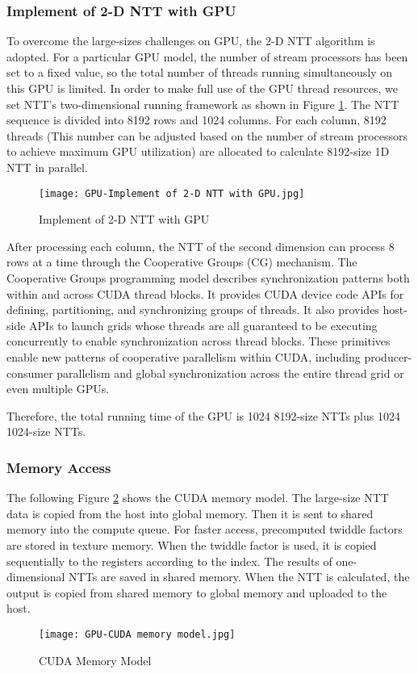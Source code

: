 \subsubsection{Implement of 2-D NTT with GPU}
To overcome the large-sizes challenges on GPU, the 2-D NTT algorithm is adopted. For a particular GPU model, the number of stream processors has been set to a fixed value, so the total number of threads running simultaneously on this GPU is limited. In order to make full use of the GPU thread resources, we set NTT's two-dimensional running framework as shown in Figure \ref{fig:Implement of 2-D NTT with GPU}. The NTT sequence is divided into 8192 rows and 1024 columns. For each column, 8192 threads (This number can be adjusted based on the number of stream processors to achieve maximum GPU utilization) are allocated to calculate 8192-size 1D NTT in parallel.
\begin{figure}[!ht]
    \centering
    \texttt{[image: GPU-Implement of 2-D NTT with GPU.jpg]}
    \caption{Implement of 2-D NTT with GPU}
    \label{fig:Implement of 2-D NTT with GPU}
\end{figure}

After processing each column, the NTT of the second dimension can process 8 rows at a time through the Cooperative Groups (CG) mechanism. The Cooperative Groups programming model describes synchronization patterns both within and across CUDA thread blocks. It provides CUDA device code APIs for defining, partitioning, and synchronizing groups of threads. It also provides host-side APIs to launch grids whose threads are all guaranteed to be executing concurrently to enable synchronization across thread blocks. These primitives enable new patterns of cooperative parallelism within CUDA, including producer-consumer parallelism and global synchronization across the entire thread grid or even multiple GPUs.

Therefore, the total running time of the GPU is 1024 8192-size NTTs plus 1024 1024-size NTTs.
\subsubsection{Memory Access}
The following Figure \ref{fig:CUDA Memory Model} shows the CUDA memory model. The large-size NTT data is copied from the host into global memory. Then it is sent to shared memory into the compute queue. For faster access, precomputed twiddle factors are stored in texture memory. When the twiddle factor is used, it is copied sequentially to the registers according to the index. The results of one-dimensional NTTs are saved in shared memory. When the NTT is calculated, the output is copied from shared memory to global memory and uploaded to the host.
\begin{figure}[!ht]
    \centering
    \texttt{[image: GPU-CUDA memory model.jpg]}
    \caption{CUDA Memory Model}
    \label{fig:CUDA Memory Model}
\end{figure}

